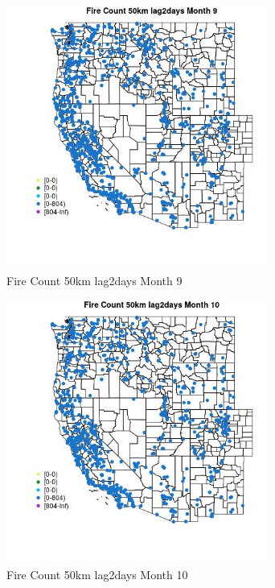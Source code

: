 \begin{figure} 
\centering  
\includegraphics[width=0.77\textwidth]{Code_Outputs/Report_ML_input_PM25_Step4_part_f_de_duplicated_aves_prioritize_24hr_obswNAs_MapObsMo9Fire_Count_50km_lag2days.jpg} 
\caption{\label{fig:Report_ML_input_PM25_Step4_part_f_de_duplicated_aves_prioritize_24hr_obswNAsMapObsMo9Fire_Count_50km_lag2days}Fire Count 50km lag2days Month 9} 
\end{figure} 
 

\clearpage 

\begin{figure} 
\centering  
\includegraphics[width=0.77\textwidth]{Code_Outputs/Report_ML_input_PM25_Step4_part_f_de_duplicated_aves_prioritize_24hr_obswNAs_MapObsMo10Fire_Count_50km_lag2days.jpg} 
\caption{\label{fig:Report_ML_input_PM25_Step4_part_f_de_duplicated_aves_prioritize_24hr_obswNAsMapObsMo10Fire_Count_50km_lag2days}Fire Count 50km lag2days Month 10} 
\end{figure} 
 

